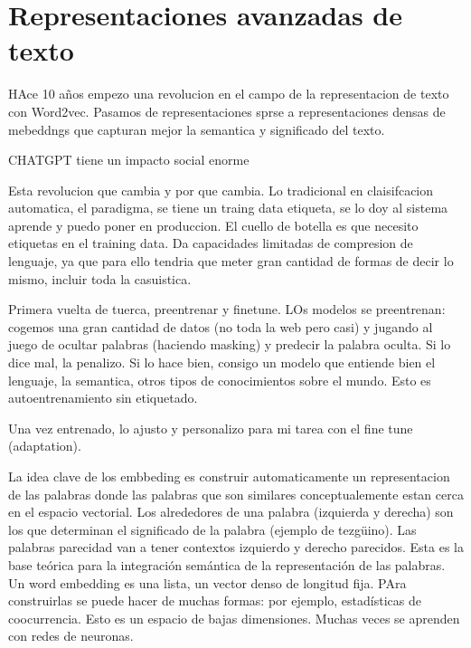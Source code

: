 \chapter{Representaciones avanzadas de texto}\label{Chapter6} 

HAce 10 años empezo una revolucion en el campo de la representacion de texto con Word2vec. Pasamos de representaciones sprse a representaciones densas de mebeddngs que capturan mejor la semantica y significado del texto. 

CHATGPT tiene un impacto social enorme


Esta revolucion que cambia y por que cambia. Lo tradicional en claisifcacion automatica, el paradigma, se tiene un traing data etiqueta, se lo doy al sistema aprende y puedo poner en produccion. El cuello de botella es que necesito etiquetas en el training data. Da capacidades limitadas de compresion de lenguaje, ya que para ello tendria que meter gran cantidad de formas de decir lo mismo, incluir toda la casuistica.

Primera vuelta de tuerca, preentrenar y finetune. LOs modelos se preentrenan: cogemos una gran cantidad de datos (no toda la web pero casi) y jugando al juego de ocultar palabras (haciendo masking) y predecir la palabra oculta. Si lo dice mal, la penalizo. Si lo hace bien, consigo un modelo que entiende bien el lenguaje, la semantica, otros tipos de conocimientos sobre el mundo. Esto es autoentrenamiento sin etiquetado.  


Una vez entrenado, lo ajusto y personalizo para mi tarea con el fine tune (adaptation). 





La idea clave de los embbeding es construir automaticamente un representacion de las palabras donde las palabras que son similares conceptualemente estan cerca en el espacio vectorial. Los alrededores de una palabra (izquierda y derecha) son los que determinan el significado de la palabra (ejemplo de tezgüino). Las palabras parecidad van a tener contextos izquierdo y derecho parecidos. Esta es la base teórica para la integración semántica de la representación de las palabras. \\

Un word embedding es una lista, un vector denso de longitud fija. PAra construirlas se puede hacer de muchas formas: por ejemplo, estadísticas de coocurrencia. Esto es un espacio de bajas dimensiones. Muchas veces se aprenden con redes de neuronas. \\

